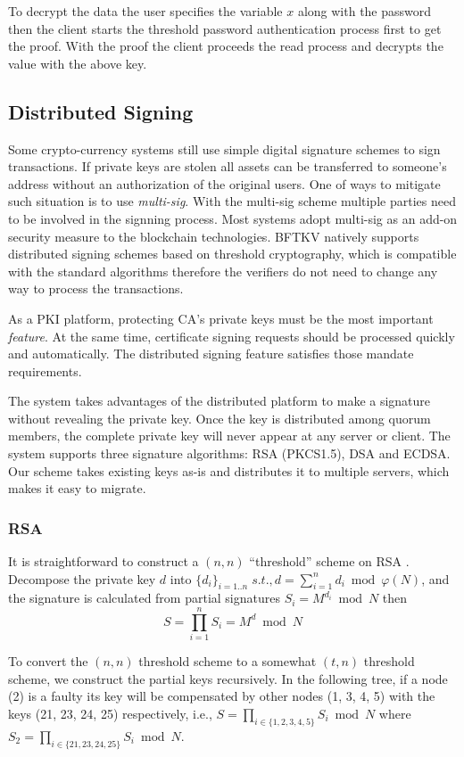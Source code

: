 To decrypt the data the user specifies the variable $x$ along with the
password then the client starts the threshold password authentication
process first to get the proof. With the proof the client proceeds the
{\sf read} process and decrypts the value with the above key.

\subsection{Distributed Signing}
Some crypto-currency systems still use simple digital signature
schemes to sign transactions. If private keys are stolen all assets
can be transferred to someone's address without an authorization of
the original users. One of ways to mitigate such situation is to
use {\em multi-sig}. With the multi-sig scheme multiple parties need
to be involved in the signning process. Most systems adopt multi-sig
as an add-on security measure to the blockchain technologies. BFTKV
natively supports distributed signing schemes based on threshold
cryptography, which is compatible with the standard algorithms
therefore the verifiers do not need to change any way to process the
transactions.

As a PKI platform, protecting CA's private keys must be the most
important {\em feature}. At the same time, certificate signing
requests should be processed quickly and automatically. The
distributed signing feature satisfies those mandate requirements.

The system takes advantages of the distributed platform to make a
signature without revealing the private key. Once the key is
distributed among quorum members, the complete private key will never
appear at any server or client. The system supports three
signature algorithms: RSA (PKCS1.5), DSA and ECDSA. Our scheme takes
existing keys as-is and distributes it to multiple servers, which
makes it easy to migrate.

\subsubsection*{RSA}
It is straightforward to construct a $(n, n)$ ``threshold'' scheme on
RSA \cite{garay,rabin}. Decompose the private key $d$ into $\{d_i\}_{i =
1..n} \; s.t., d = \sum_{i=1}^{n} d_i \bmod \varphi(N)$, and the
signature is calculated from partial signatures $S_i = M^{d_i} \bmod
N$ then
\[
  S = \prod_{i=1}^{n} S_i = M^d \bmod N
\]

To convert the $(n, n)$ threshold scheme to a somewhat $(t, n)$
threshold scheme, we construct the partial keys recursively. In the
following tree, if a node (2) is a faulty its key will be compensated
by other nodes (1, 3, 4, 5) with the keys (21, 23, 24, 25)
respectively, i.e., $S = \prod_{i \in \{1,2,3,4,5\}} S_i \bmod N$
where $S_2 = \prod_{i \in \{21,23,24,25\}} S_i \bmod N$.


